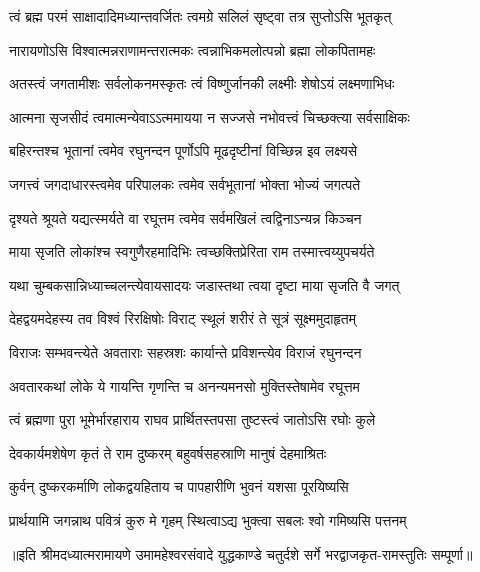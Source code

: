 

\addtocounter{shlokacount}{9}

\twolineshloka
{त्वं ब्रह्म परमं साक्षादादिमध्यान्तवर्जितः}
{त्वमग्रे सलिलं सृष्ट्वा तत्र सुप्तोऽसि भूतकृत्} %

\twolineshloka
{नारायणोऽसि विश्वात्मन्नराणामन्तरात्मकः}
{त्वन्नाभिकमलोत्पन्नो ब्रह्मा लोकपितामहः} %

\twolineshloka
{अतस्त्वं जगतामीशः सर्वलोकनमस्कृतः}
{त्वं विष्णुर्जानकी लक्ष्मीः शेषोऽयं लक्ष्मणाभिधः} %

\twolineshloka
{आत्मना सृजसीदं त्वमात्मन्येवाऽऽत्ममायया}
{न सज्जसे नभोवत्त्वं चिच्छक्त्या सर्वसाक्षिकः} %

\twolineshloka
{बहिरन्तश्च भूतानां त्वमेव रघुनन्दन}
{पूर्णोऽपि मूढदृष्टीनां विच्छिन्न इव लक्ष्यसे} %

\twolineshloka
{जगत्त्वं जगदाधारस्त्वमेव परिपालकः}
{त्वमेव सर्वभूतानां भोक्ता भोज्यं जगत्पते} %

\twolineshloka
{दृश्यते श्रूयते यद्यत्स्मर्यते वा रघूत्तम}
{त्वमेव सर्वमखिलं त्वद्विनाऽन्यन्न किञ्चन} %

\twolineshloka
{माया सृजति लोकांश्च स्वगुणैरहमादिभिः}
{त्वच्छक्तिप्रेरिता राम तस्मात्त्वय्युपचर्यते} %

\twolineshloka
{यथा चुम्बकसान्निध्याच्चलन्त्येवायसादयः}
{जडास्तथा त्वया दृष्टा माया सृजति वै जगत्} %

\twolineshloka
{देहद्वयमदेहस्य तव विश्वं रिरक्षिषोः}
{विराट् स्थूलं शरीरं ते सूत्रं सूक्ष्ममुदाहृतम्} %

\twolineshloka
{विराजः सम्भवन्त्येते अवताराः सहस्रशः}
{कार्यान्ते प्रविशन्त्येव विराजं रघुनन्दन} %

\twolineshloka
{अवतारकथां लोके ये गायन्ति गृणन्ति च}
{अनन्यमनसो मुक्तिस्तेषामेव रघूत्तम} %

\twolineshloka
{त्वं ब्रह्मणा पुरा भूमेर्भारहाराय राघव}
{प्रार्थितस्तपसा तुष्टस्त्वं जातोऽसि रघोः कुले} %

\twolineshloka
{देवकार्यमशेषेण कृतं ते राम दुष्करम्}
{बहुवर्षसहस्राणि मानुषं देहमाश्रितः} %

\twolineshloka
{कुर्वन् दुष्करकर्माणि लोकद्वयहिताय च}
{पापहारीणि भुवनं यशसा पूरयिष्यसि} %

\twolineshloka
{प्रार्थयामि जगन्नाथ पवित्रं कुरु मे गृहम्}
{स्थित्वाऽद्य भुक्त्वा सबलः श्वो गमिष्यसि पत्तनम्} %


{॥इति श्रीमदध्यात्मरामायणे उमामहेश्वरसंवादे युद्धकाण्डे चतुर्दशे  सर्गे
भरद्वाजकृत-रामस्तुतिः सम्पूर्णा॥}
